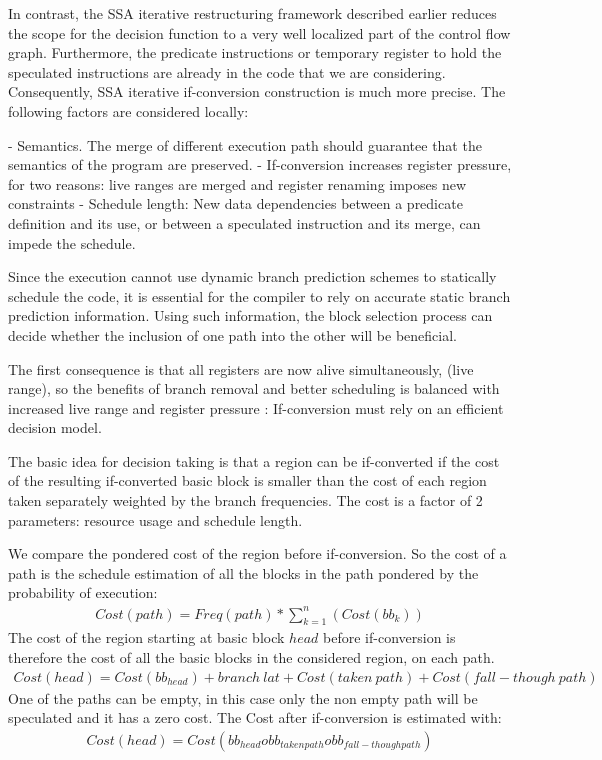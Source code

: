 In contrast, the SSA iterative restructuring framework described earlier reduces the scope for the decision function to a very well localized part of the control flow graph. Furthermore, the predicate instructions or temporary register to hold the speculated instructions are already in the code that we are considering. Consequently, SSA iterative if-conversion construction is much more precise. The following factors are considered locally: 

- Semantics. The merge of different execution path should guarantee that the semantics of the program are preserved.
- If-conversion increases register pressure, for two reasons: live ranges are merged and register renaming imposes new constraints
- Schedule length: New data dependencies between a predicate definition and its use, or between a speculated instruction and its merge, can impede the schedule.

Since the execution cannot use dynamic branch prediction schemes to statically schedule the code, it is essential for the compiler to rely on accurate static branch prediction information. Using such information, the block selection process can decide whether the inclusion of one path into the other will be beneficial. 

The first consequence is that all registers are now alive simultaneously, (live range), so the benefits of branch removal and better scheduling is balanced with increased live range and register pressure : If-conversion must rely on an efficient decision model.

The basic idea for decision taking is that a region can be if-converted if the cost of the resulting if-converted basic block is smaller than the cost of each region taken separately weighted by the branch frequencies. The cost is a factor of 2 parameters: resource usage and schedule length.

We compare the pondered cost of the region before if-conversion. So the cost of a path is the schedule estimation of all the blocks in the path pondered by the probability of execution:
\begin{align}
Cost(path)=Freq(path)*\sum_{k=1}^n(Cost(bb_{k}))
\end{align}
The cost of the region starting at basic block $head$ before if-conversion is therefore the cost of all the basic blocks in the considered region, on each path.
\begin{align}
Cost(head)=Cost(bb_{head})+branch\:lat+Cost(taken\:path)+Cost(fall-though\:path)
\end{align}
One of the paths can be empty, in this case only the non empty path will be speculated and it has a zero cost. The Cost after if-conversion is estimated with:
\begin{align}
Cost(head)=Cost(bb_{head} o bb_{taken path} o bb_{fall-though path})
\end{align}

